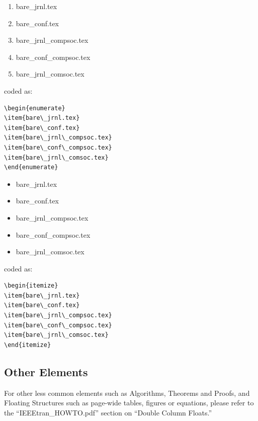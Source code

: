 \documentclass[lettersize,journal]{IEEEtran}
\begin{document}
\begin{enumerate}
  \item{bare\_jrnl.tex}
  \item{bare\_conf.tex}
  \item{bare\_jrnl\_compsoc.tex}
  \item{bare\_conf\_compsoc.tex}
  \item{bare\_jrnl\_comsoc.tex}
\end{enumerate}
\noindent coded as:
\begin{verbatim}
\begin{enumerate}
\item{bare\_jrnl.tex}
\item{bare\_conf.tex}
\item{bare\_jrnl\_compsoc.tex}
\item{bare\_conf\_compsoc.tex}
\item{bare\_jrnl\_comsoc.tex}
\end{enumerate}
\end{verbatim}


\begin{itemize}
  \item{bare\_jrnl.tex}
  \item{bare\_conf.tex}
  \item{bare\_jrnl\_compsoc.tex}
  \item{bare\_conf\_compsoc.tex}
  \item{bare\_jrnl\_comsoc.tex}
\end{itemize}

\noindent coded as:

\begin{verbatim}
\begin{itemize}
\item{bare\_jrnl.tex}
\item{bare\_conf.tex}
\item{bare\_jrnl\_compsoc.tex}
\item{bare\_conf\_compsoc.tex}
\item{bare\_jrnl\_comsoc.tex}
\end{itemize}
\end{verbatim}


\subsection{Other Elements}
\noindent For other less common elements such as Algorithms, Theorems and Proofs, and Floating Structures such as page-wide tables, figures or equations, please refer to the ``IEEEtran\_HOWTO.pdf'' section on ``Double Column Floats.''
\end{document}

